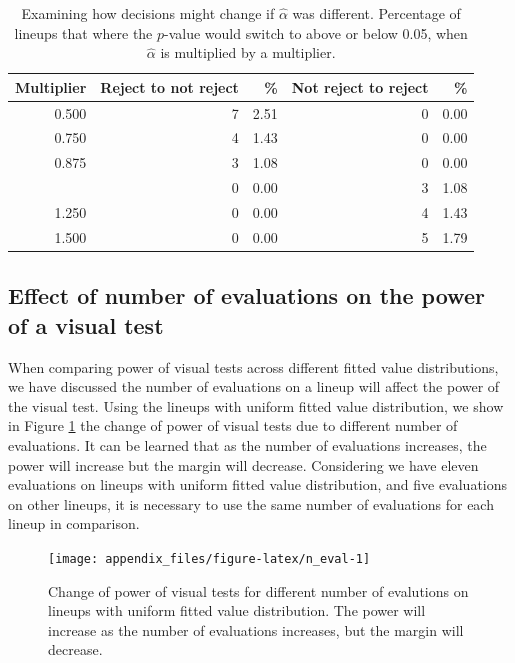 \documentclass[]{interact}
\theoremstyle{plain}%
\theoremstyle{definition}
\theoremstyle{remark}
\begin{document}
\begin{table}

\caption{\label{tab:sensitivity}Examining how decisions might change if $\hat{\alpha}$ was different. Percentage of lineups that where the $p$-value would switch to above or below 0.05, when $\hat{\alpha}$ is multiplied by a multiplier.}
\centering
\begin{tabular}[t]{rrrrr}
\toprule
Multiplier & Reject to not reject & \% & Not reject to reject & \%\\
\midrule
0.500 & 7 & 2.51 & 0 & 0.00\\
0.750 & 4 & 1.43 & 0 & 0.00\\
0.875 & 3 & 1.08 & 0 & 0.00\\
\addlinespace
1.125 & 0 & 0.00 & 3 & 1.08\\
1.250 & 0 & 0.00 & 4 & 1.43\\
1.500 & 0 & 0.00 & 5 & 1.79\\
\bottomrule
\end{tabular}
\end{table}

\hypertarget{effect-of-number-of-evaluations-on-the-power-of-a-visual-test}{%
\subsection{Effect of number of evaluations on the power of a visual
test}\label{effect-of-number-of-evaluations-on-the-power-of-a-visual-test}}

When comparing power of visual tests across different fitted value
distributions, we have discussed the number of evaluations on a lineup
will affect the power of the visual test. Using the lineups with uniform
fitted value distribution, we show in Figure \ref{fig:n_eval} the change
of power of visual tests due to different number of evaluations. It can
be learned that as the number of evaluations increases, the power will
increase but the margin will decrease. Considering we have eleven
evaluations on lineups with uniform fitted value distribution, and five
evaluations on other lineups, it is necessary to use the same number of
evaluations for each lineup in comparison.

\begin{figure}

{\centering \texttt{[image: appendix\_files/figure-latex/n\_eval-1]} 

}

\caption{Change of power of visual tests for different number of evalutions on lineups with uniform fitted value distribution. The power will increase as the number of evaluations increases, but the margin will decrease.}\label{fig:n_eval}
\end{figure}
\end{document}
